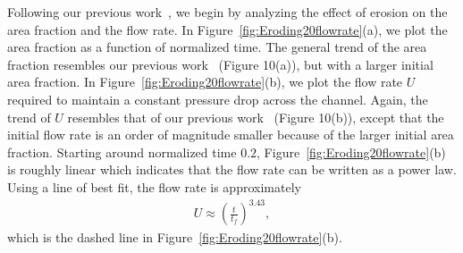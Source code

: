 \documentclass[preprint,10pt]{elsarticle}
\begin{document}
Following our previous work~\cite{qua-moo2018}, we begin by analyzing
the effect of erosion on the area fraction and the flow rate.  In
Figure~\ref{fig:Eroding20flowrate}(a), we plot the area fraction as a
function of normalized time.  The general trend of the area fraction
resembles our previous work~\cite{qua-moo2018} (Figure 10(a)), but with
a larger initial area fraction.  In
Figure~\ref{fig:Eroding20flowrate}(b), we plot the flow rate $U$
required to maintain a constant pressure drop across the channel.
Again, the trend of $U$ resembles that of our previous
work~\cite{qua-moo2018} (Figure 10(b)), except that the initial flow
rate is an order of magnitude smaller because of the larger initial area
fraction.  Starting around normalized time $0.2$,
Figure~\ref{fig:Eroding20flowrate}(b) is roughly linear which indicates
that the flow rate can be written as a power law.  Using a line of best
fit, the flow rate is approximately 
\begin{align} 
  U \approx \left(\frac{t}{t_f}\right)^{3.43},
\end{align}
which is the dashed line in Figure~\ref{fig:Eroding20flowrate}(b).
\end{document}
